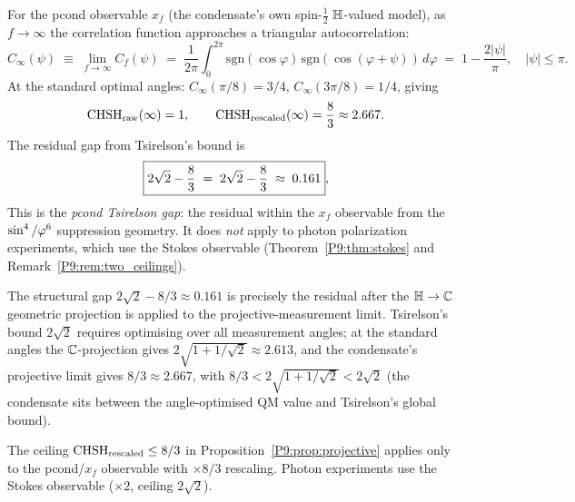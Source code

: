 \begin{proposition}
\label{P9:prop:projective}
For the pcond observable $x_f$ (the condensate's own spin-$\tfrac{1}{2}$
$\mathbb{H}$-valued model), as $f\to\infty$ the correlation function approaches
a triangular autocorrelation:
\begin{equation}
  C_\infty(\psi) \;\equiv\; \lim_{f\to\infty} C_f(\psi)
  \;=\; \frac{1}{2\pi}\int_0^{2\pi}
  \mathrm{sgn}(\cos\varphi)\,\mathrm{sgn}(\cos(\varphi+\psi))\,d\varphi
  \;=\; 1 - \frac{2|\psi|}{\pi},
  \quad |\psi|\leq\pi.
\end{equation}
At the standard optimal angles:
$C_\infty(\pi/8)=3/4$, $C_\infty(3\pi/8)=1/4$, giving
\begin{equation}
  \mathrm{CHSH}_\mathrm{raw}(\infty) = 1,
  \qquad
  \mathrm{CHSH}_\mathrm{rescaled}(\infty) = \frac{8}{3} \approx 2.667.
  \label{P9:eq:chsh_projective}
\end{equation}
The residual gap from Tsirelson's bound is
\begin{equation}
  \boxed{2\sqrt{2} - \frac{8}{3}
  \;=\; 2\sqrt{2} - \frac{8}{3}
  \;\approx\; 0.161},
  \label{P9:eq:structural_gap}
\end{equation}
This is the \emph{pcond Tsirelson gap}: the residual within the
$x_f$ observable from the $\sin^4/\varphi^6$ suppression geometry.
It does \emph{not} apply to photon polarization experiments,
which use the Stokes observable
(Theorem~\ref{P9:thm:stokes} and Remark~\ref{P9:rem:two_ceilings}).
\end{proposition}

\begin{remark}
\label{P9:rem:structural_gap_projection}
The structural gap $2\sqrt{2}-8/3\approx0.161$ is precisely the
residual after the $\mathbb{H}\to\mathbb{C}$ geometric projection is applied to
the projective-measurement limit.
Tsirelson's bound $2\sqrt{2}$ requires optimising over all measurement
angles; at the standard angles the $\mathbb{C}$-projection gives
$2\sqrt{1+1/\sqrt{2}}\approx2.613$, and the condensate's
projective limit gives $8/3\approx2.667$, with
$8/3 < 2\sqrt{1+1/\sqrt{2}} < 2\sqrt{2}$ (the condensate sits
between the angle-optimised QM value and Tsirelson's global bound).
\end{remark}

\begin{remark}
\label{P9:rem:projective_scope}
The ceiling $\mathrm{CHSH}_\mathrm{rescaled}\leq8/3$ in Proposition~\ref{P9:prop:projective}
applies only to the pcond/$x_f$ observable with $\times8/3$ rescaling.
Photon experiments use the Stokes observable ($\times2$, ceiling $2\sqrt{2}$).
\end{remark}

